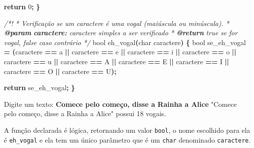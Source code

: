 \documentclass[
  11pt,
  a4paper,
]{scrbook}
\newenvironment{Shaded}{\begin{snugshade}}{\end{snugshade}}
\newcommand{\AnnotationTok}[1]{\textcolor[rgb]{0.56,0.35,0.01}{\textbf{\textit{#1}}}}
\newcommand{\CharTok}[1]{\textcolor[rgb]{0.31,0.60,0.02}{#1}}
\newcommand{\CommentTok}[1]{\textcolor[rgb]{0.56,0.35,0.01}{\textit{#1}}}
\newcommand{\CommentVarTok}[1]{\textcolor[rgb]{0.56,0.35,0.01}{\textbf{\textit{#1}}}}
\newcommand{\ControlFlowTok}[1]{\textcolor[rgb]{0.13,0.29,0.53}{\textbf{#1}}}
\newcommand{\DataTypeTok}[1]{\textcolor[rgb]{0.13,0.29,0.53}{#1}}
\newcommand{\DecValTok}[1]{\textcolor[rgb]{0.00,0.00,0.81}{#1}}
\newcommand{\KeywordTok}[1]{\textcolor[rgb]{0.13,0.29,0.53}{\textbf{#1}}}
\newcommand{\NormalTok}[1]{#1}
\newcommand{\OperatorTok}[1]{\textcolor[rgb]{0.81,0.36,0.00}{\textbf{#1}}}
\begin{document}
\begin{Shaded}
\begin{Highlighting}[]
    \ControlFlowTok{return} \DecValTok{0}\OperatorTok{;}
\OperatorTok{\}}

\CommentTok{/*!}
\CommentTok{ * Verificação se um caractere é uma vogal (maiúscula ou minúscula).}
\CommentTok{ * }\AnnotationTok{@param}\CommentTok{ }\CommentVarTok{caractere:}\CommentTok{ caractere simples a ser verificado}
\CommentTok{ * }\AnnotationTok{@return}\CommentTok{ true se for vogal, false caso contrário}
\CommentTok{ */}
\DataTypeTok{bool}\NormalTok{ eh\_vogal}\OperatorTok{(}\DataTypeTok{char}\NormalTok{ caractere}\OperatorTok{)} \OperatorTok{\{}
    \DataTypeTok{bool}\NormalTok{ se\_eh\_vogal }\OperatorTok{=}
            \OperatorTok{(}\NormalTok{caractere }\OperatorTok{==} \CharTok{\textquotesingle{}a\textquotesingle{}} \OperatorTok{||}\NormalTok{ caractere }\OperatorTok{==} \CharTok{\textquotesingle{}e\textquotesingle{}} \OperatorTok{||}\NormalTok{ caractere }\OperatorTok{==} \CharTok{\textquotesingle{}i\textquotesingle{}} \OperatorTok{||}
\NormalTok{             caractere }\OperatorTok{==} \CharTok{\textquotesingle{}o\textquotesingle{}} \OperatorTok{||}\NormalTok{ caractere }\OperatorTok{==} \CharTok{\textquotesingle{}u\textquotesingle{}} \OperatorTok{||}\NormalTok{ caractere }\OperatorTok{==} \CharTok{\textquotesingle{}A\textquotesingle{}} \OperatorTok{||}
\NormalTok{             caractere }\OperatorTok{==} \CharTok{\textquotesingle{}E\textquotesingle{}} \OperatorTok{||}\NormalTok{ caractere }\OperatorTok{==} \CharTok{\textquotesingle{}I\textquotesingle{}} \OperatorTok{||}\NormalTok{ caractere }\OperatorTok{==} \CharTok{\textquotesingle{}O\textquotesingle{}} \OperatorTok{||}
\NormalTok{             caractere }\OperatorTok{==} \CharTok{\textquotesingle{}U\textquotesingle{}}\OperatorTok{);}

    \ControlFlowTok{return}\NormalTok{ se\_eh\_vogal}\OperatorTok{;}
\OperatorTok{\}}
\end{Highlighting}
\end{Shaded}

\begin{Shaded}
\begin{Highlighting}[]
\NormalTok{Digite um texto: }\KeywordTok{ Comece pelo começo, disse a Rainha a Alice }
\NormalTok{"Comece pelo começo, disse a Rainha a Alice" possui 18 vogais.}
\end{Highlighting}
\end{Shaded}

A função declarada é lógica, retornando um valor \texttt{bool}, o nome
escolhido para ela é \texttt{eh\_vogal} e ela tem um único parâmetro que
é um \texttt{char} denominado \texttt{caractere}.
\end{document}

